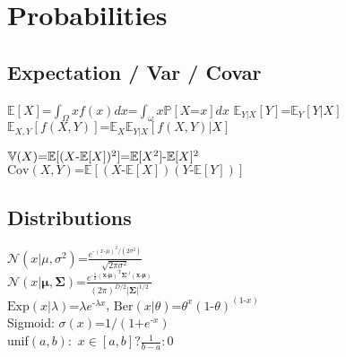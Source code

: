 
\section*{Probabilities}
\subsection*{Expectation / Var / Covar}
$\mathbb{E}[X]\text{=}\int_{\Omega}xf(x)d x\text{=}\int_{\omega}x\mathbb{P}[X{\text{=}}x]d x$
$\mathbb{E}_{Y|X}[Y]\text{=}\mathbb{E}_{Y}[Y|X]$\\
$\mathbb{E}_{X,Y}[f(X,Y)]\text{=}\mathbb{E}_{X}\mathbb{E}_{Y|X}[f(X,Y)|X]$

$\mathbb{V}(X)\text{\text{=}}\mathbb{E}[(X{\text{\text{-}}}\mathbb{E}[X])^2]\text{\text{=}}\mathbb{E}[X^2]\text{\text{-}}\mathbb{E}[X]^2$\\

$\mathrm{Cov}(X,Y)\text{=}\mathbb{E}[(X\text{-}\mathbb{E}[X])(Y\text{-}\mathbb{E}[Y])]$
\subsection*{Distributions}
$\mathcal{N}(x|\mu, \sigma^2)\text{=}\frac{e^{\text{-}(x\text{-}\mu)^2/(2\sigma^2)}}{\sqrt{2\pi\sigma^2}}$\\
$\mathcal{N}(x|\bm{\mu}, \bm{\Sigma})\text{=} \frac{e^{\text{-}\frac{1}{2}(\mathbf{x}\text{-}\bm{\mu})^\text{T}\bm{\Sigma}^{\text{-}1}(\mathbf{x}\text{-}\bm{\mu})}}{(2\pi)^{D/2}|\bm{\Sigma}|^{1/2}} $\\
$\mathrm{Exp}(x|\lambda){\text{=}}\lambda e^{\text{-}\lambda x}$, $\mathrm{Ber}(x|\theta){\text{=}}\theta^x (1{\text{-}}\theta)^{(1\text{-}x)}$\\
Sigmoid: $\sigma(x)\text{=}1/(1\text{+}e^{\text{-}x})$\\
unif$(a,b):$ $x\in [a,b]? \frac{1}{b-a} : 0$




